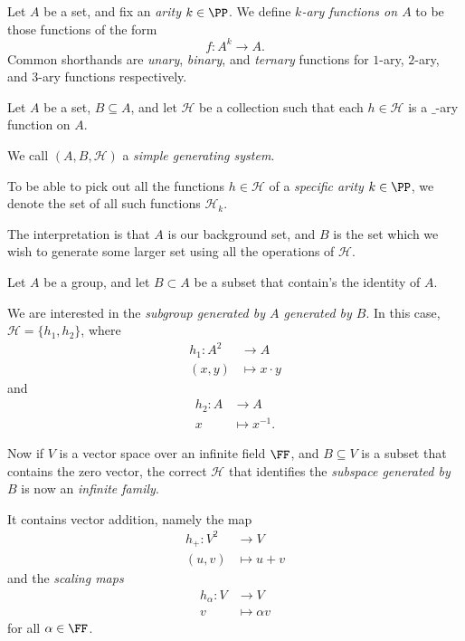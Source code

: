 \documentclass{article}
\begin{document}
\begin{definition}
    Let $A$ be a set, and fix an \textit{arity} $k \in \PP$.
    We define \textit{$k$-ary functions on $A$} to be those functions of the form
    \[
        f: A^k \to A.
    \]
    Common shorthands are \textit{unary}, \textit{binary}, and \textit{ternary} functions for $1$-ary, $2$-ary, and $3$-ary functions respectively.
\end{definition}

\begin{definition}
    Let $A$ be a set, $B \subseteq A$, and let $\mathcal{H}$ be a collection such that each $h \in \mathcal{H}$ is a $\_$-ary function on $A$.

    We call $(A, B, \mathcal{H})$ a \textit{simple generating system}.

    To be able to pick out all the functions $h \in \mathcal{H}$ of a \textit{specific arity} $k \in \PP$, we denote the set of all such functions $\mathcal{H}_k$.
\end{definition}

The interpretation is that $A$ is our background set, and $B$ is the set which we wish to generate some larger set using all the operations of $\mathcal{H}$.

\begin{example}
    Let $A$ be a group, and let $B \subset A$ be a subset that contain's the identity of $A$.

    We are interested in the \textit{subgroup generated by $A$ generated by $B$}.
    In this case, $\mathcal{H} = \{h_1,h_2\}$, where
    \begin{align*}
        h_1: A^2 &\to A \\
        (x,y) &\mapsto x \cdot y
    \end{align*}
    and 
    \begin{align*}
        h_2: A &\to A \\
        x &\mapsto x^{-1}.
    \end{align*}
\end{example}

\begin{example}
    Now if $V$ is a vector space over an infinite field $\FF$, and $B \subseteq V$ is a subset that contains the zero vector, the correct $\mathcal{H}$ that identifies the \textit{subspace generated by $B$} is now an \textit{infinite family}.

    It contains vector addition, namely the map
    \begin{align*}
        h_+: V^2 &\to V \\
        (u,v) &\mapsto u + v
    \end{align*}
    and the \textit{scaling maps}
    \begin{align*}
        h_\alpha: V &\to V \\
        v &\mapsto \alpha v
    \end{align*}
    for all $\alpha \in \FF$.
\end{example}
\end{document}
